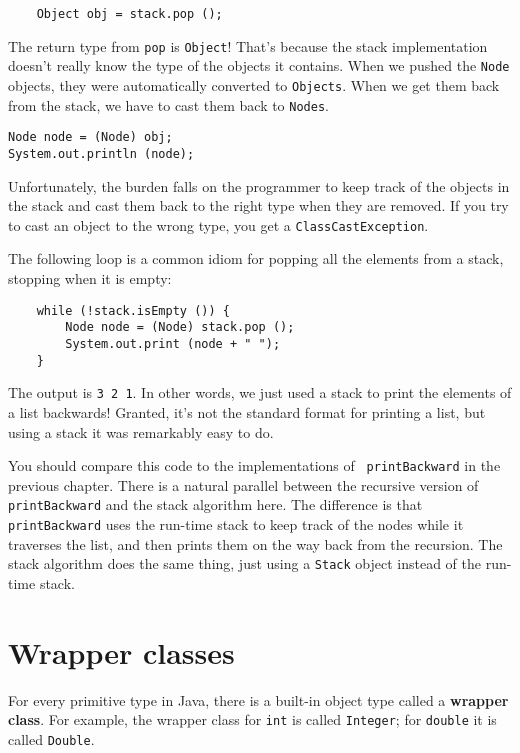 \begin{verbatim}
    Object obj = stack.pop ();
\end{verbatim}
%
The return type from {\tt pop} is {\tt Object}!  That's because the
stack implementation doesn't really know the type of the objects it
contains.  When we pushed the {\tt Node} objects, they were automatically
converted to {\tt Objects}.  When we get them back from the stack,
we have to cast them back to {\tt Nodes}.

\begin{verbatim}
Node node = (Node) obj;
System.out.println (node);
\end{verbatim}
%
Unfortunately, the burden falls on the programmer to keep track of the
objects in the stack and cast them back to the right type when they
are removed.  If you try to cast an object to the wrong type, you get
a {\tt ClassCastException}.

The following loop is a common idiom for popping all the elements
from a stack, stopping when it is empty:

\begin{verbatim}
    while (!stack.isEmpty ()) {
        Node node = (Node) stack.pop ();
        System.out.print (node + " ");
    }

\end{verbatim}
%
The output is {\tt 3 2 1}.  In other words, we just used a stack
to print the elements of a list backwards!  Granted, it's not the
standard format for printing a list, but using a stack it was
remarkably easy to do.

You should compare this code to the implementations of {\tt
printBackward} in the previous chapter.  There is a natural parallel
between the recursive version of {\tt printBackward} and the stack
algorithm here.  The difference is that {\tt printBackward} uses the
run-time stack to keep track of the nodes while it traverses the list,
and then prints them on the way back from the recursion.  The stack
algorithm does the same thing, just using a {\tt Stack} object instead
of the run-time stack.


\section {Wrapper classes}

For every primitive type in Java, there is a built-in object type
called a {\bf wrapper class}.  For example, the wrapper class for
{\tt int} is called {\tt Integer}; for {\tt double} it is called
{\tt Double}.

